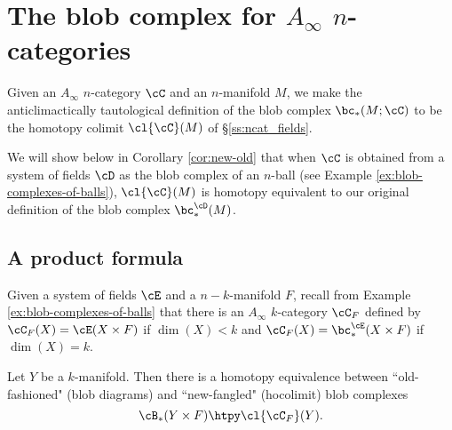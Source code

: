 
\section{The blob complex for \texorpdfstring{$A_\infty$}{A-infinity} \texorpdfstring{$n$}{n}-categories}
\label{sec:ainfblob}
Given an $A_\infty$ $n$-category $\cC$ and an $n$-manifold $M$, we make the anticlimactically tautological definition of the blob
complex $\bc_*(M;\cC)$ to be the homotopy colimit $\cl{\cC}(M)$ of \S\ref{ss:ncat_fields}.

We will show below 
in Corollary \ref{cor:new-old}
that when $\cC$ is obtained from a system of fields $\cD$ 
as the blob complex of an $n$-ball (see Example \ref{ex:blob-complexes-of-balls}), 
$\cl{\cC}(M)$ is homotopy equivalent to
our original definition of the blob complex $\bc_*^\cD(M)$.


%

\subsection{A product formula}
\label{ss:product-formula}


Given a system of fields $\cE$ and a $n{-}k$-manifold $F$, recall from 
Example \ref{ex:blob-complexes-of-balls} that there is an  $A_\infty$ $k$-category $\cC_F$ 
defined by $\cC_F(X) = \cE(X\times F)$ if $\dim(X) < k$ and
$\cC_F(X) = \bc_*^\cE(X\times F)$ if $\dim(X) = k$.


\begin{thm} \label{thm:product}
Let $Y$ be a $k$-manifold.
Then there is a homotopy equivalence between ``old-fashioned" (blob diagrams) 
and ``new-fangled" (hocolimit) blob complexes
\[
	\cB_*(Y \times F) \htpy \cl{\cC_F}(Y) .
\]\end{thm}

